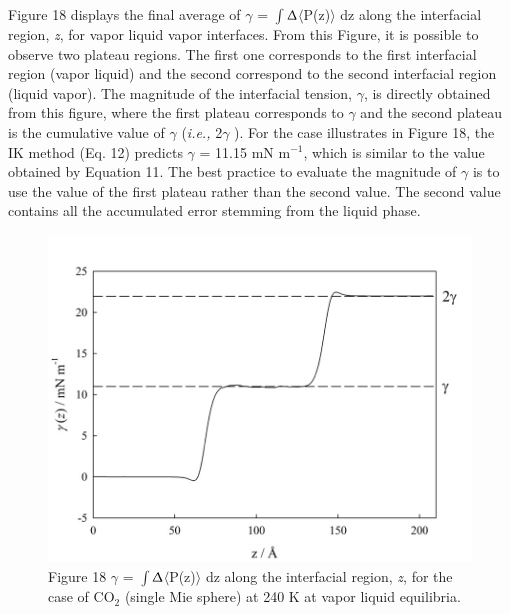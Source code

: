 \documentclass{scrbook}
\begin{document}
Figure 18 displays the final average of ${\gamma}$
= ${\int}$${\Updelta}$${\langle}$P(z)${\rangle}$ dz along the interfacial
region, \textit{z}, for vapor \textendash{} liquid \textendash{} vapor
interfaces. From this Figure, it is possible to observe two plateau regions.
The first one corresponds to the first interfacial region (vapor \textendash{}
liquid) and the second correspond to the second interfacial region (liquid
\textendash{} vapor). The magnitude of the interfacial tension, ${\gamma}$, is
directly obtained from this figure, where the first plateau corresponds to
${\gamma}$ and the second plateau is the cumulative value of ${\gamma}$
(\textit{i.e.,} 2${\gamma}$ ). For the case illustrates in Figure 18, the IK
method (Eq. 12) predicts ${\gamma}$ = 11.15 mN m$^{-1}$, which is similar to
the value obtained by Equation 11.
The best practice to evaluate the magnitude of ${\gamma}$ is to use the value
of the first plateau rather than the second value. The second value contains
all the accumulated error stemming from the liquid phase.
\begin{figure}
\includegraphics[width=1\textwidth]{gfx/image63.jpeg}
\caption{Figure 18 ${\gamma}$ = ${\int}$${\Updelta}$${\langle}$P(z)${\rangle}$ dz along the interfacial region, \textit{z}, for the case of CO$_{2}$ (single Mie sphere) at 240 K at vapor \textendash{} liquid equilibria.}
\label{fig:18}
\end{figure}
\end{document}

